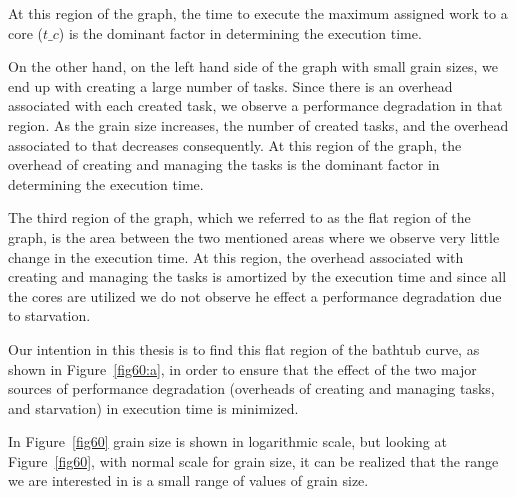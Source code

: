 At this region of the graph, the time to execute the maximum assigned work to a core ($t\_c$) is the dominant factor in determining the execution time.   

On the other hand, on the left hand side of the graph with small grain sizes, we end up with creating a large number of tasks. Since there is an overhead associated with each created task, we observe a performance degradation in that region. As the grain size increases, the number of created tasks, and the overhead associated to that decreases consequently. At this region of the graph, the overhead of creating and managing the tasks is the dominant factor in determining the execution time.   

The third region of the graph, which we referred to as the flat region of the graph, is the area between the two mentioned areas where we observe very little change in the execution time. At this region, the overhead associated with creating and managing the tasks is amortized by the execution time and since all the cores are utilized we do not observe he effect a performance degradation due to starvation.

Our intention in this thesis is to find this flat region of the bathtub curve, as shown in Figure~\ref{fig60:a}, in order to ensure that the effect of the two major sources of performance degradation (overheads of creating and managing tasks, and starvation) in execution time is minimized.

In Figure~\ref{fig60} grain size is shown in logarithmic scale, but looking at Figure~\ref{fig60}, with normal scale for grain size, it can be realized that the range we are interested in is a small range of values of grain size.  
 
